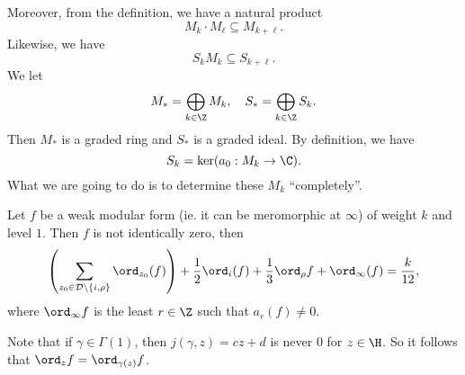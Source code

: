 \documentclass[a4paper]{article}
\begin{document}
Moreover, from the definition, we have a natural product
\[
  M_k \cdot M_\ell \subseteq M_{k + \ell}.
\]
Likewise, we have
\[
  S_k M_k \subseteq S_{k + \ell}.
\]
We let
\[
  M_* = \bigoplus_{k \in \Z} M_k,\quad S_* = \bigoplus_{k \in \Z} S_k.
\]
Then $M_*$ is a graded ring and $S_*$ is a graded ideal. By definition, we have
\[
  S_k = \ker (a_0: M_k \to \C).
\]
What we are going to do is to determine these $M_k$ ``completely''.

\begin{prop}
  Let $f$ be a weak modular form (ie. it can be meromorphic at $\infty$) of weight $k$ and level $1$. Then $f$ is not identically zero, then
  \[
    \left(\sum_{z_0 \in \mathcal{D} \setminus \{i, \rho\}} \ord_{z_0} (f)\right) + \frac{1}{2} \ord_i(f) + \frac{1}{3} \ord_\rho f + \ord_\infty(f) = \frac{k}{12},
  \]
  where $\ord_\infty f$ is the least $r \in \Z$ such that $a_r(f) \not= 0$.
\end{prop}
Note that if $\gamma \in \Gamma(1)$, then $j(\gamma, z) = cz + d$ is never $0$ for $z \in \H$. So it follows that $\ord_z f = \ord_{\gamma(z)} f$.
\end{document}
